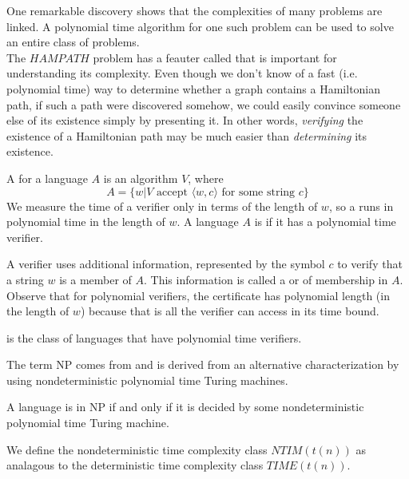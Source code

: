 \documentclass{article}
\begin{document}
One remarkable discovery shows that the complexities of many problems are linked. A polynomial time algorithm for one such problem can be used to solve an entire class of problems. \\ 

The $HAMPATH$ problem has a feauter called  that is important for understanding its complexity. Even though we don't know of a fast (i.e. polynomial time) way to determine whether a graph contains a Hamiltonian path, if such a path were discovered somehow, we could easily convince someone else of its existence simply by presenting it. In other words, \emph{verifying} the existence of a Hamiltonian path may be much easier than \emph{determining} its existence. 

\begin{definition}[Verifier]
  A  for a language $A$ is an algorithm $V$, where $$A = \{w | V \textrm{ accept } \langle w,c \rangle \textrm{ for some string } c\}$$ We measure the time of a verifier only in terms of the length of $w$, so a  runs in polynomial time in the length of $w$. A language $A$ is  if it has a polynomial time verifier. 
\end{definition}

A verifier uses additional information, represented by the symbol $c$ to verify that a string $w$ is a member of $A$. This information is called a  or  of membership in $A$. Observe that for polynomial verifiers, the certificate has polynomial length (in the length of $w$) because that is all the verifier can access in its time bound.  

\begin{definition}
   is the class of languages that have polynomial time verifiers. 
\end{definition}

The term NP comes from  and is derived from an alternative characterization by using nondeterministic polynomial time Turing machines. 

\begin{theorem}
  A language is in NP if and only if it is decided by some nondeterministic polynomial time Turing machine. 
\end{theorem}

We define the nondeterministic time complexity class $NTIM(t(n))$ as analagous to the deterministic time complexity class $TIME(t(n))$. 
\end{document}
